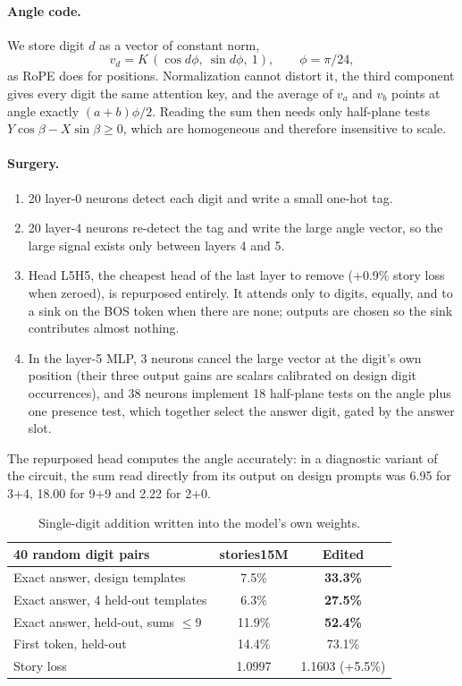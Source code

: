 \documentclass[11pt]{article}
\begin{document}
\paragraph{Angle code.} We store digit $d$ as a vector of constant norm,
\begin{equation}
v_d = K\,(\cos d\phi,\ \sin d\phi,\ 1), \qquad \phi=\pi/24,
\end{equation}
as RoPE does for positions. Normalization cannot distort it, the third component gives every digit the same attention key, and the average of $v_a$ and $v_b$ points at angle exactly $(a+b)\phi/2$. Reading the sum then needs only half-plane tests $Y\cos\beta - X\sin\beta \ge 0$, which are homogeneous and therefore insensitive to scale.

\paragraph{Surgery.}
\begin{enumerate}[leftmargin=*]
\item 20 layer-0 neurons detect each digit and write a small one-hot tag.
\item 20 layer-4 neurons re-detect the tag and write the large angle vector, so the large signal exists only between layers 4 and 5.
\item Head L5H5, the cheapest head of the last layer to remove (+0.9\% story loss when zeroed), is repurposed entirely. It attends only to digits, equally, and to a sink on the BOS token when there are none; outputs are chosen so the sink contributes almost nothing.
\item In the layer-5 MLP, 3 neurons cancel the large vector at the digit's own position (their three output gains are scalars calibrated on design digit occurrences), and 38 neurons implement 18 half-plane tests on the angle plus one presence test, which together select the answer digit, gated by the answer slot.
\end{enumerate}

The repurposed head computes the angle accurately: in a diagnostic variant of the circuit, the sum read directly from its output on design prompts was 6.95 for 3+4, 18.00 for 9+9 and 2.22 for 2+0.

\begin{table}[h]
\centering
\begin{tabular}{lcc}
\toprule
40 random digit pairs & stories15M & Edited \\
\midrule
Exact answer, design templates & 7.5\% & \textbf{33.3\%} \\
Exact answer, 4 held-out templates & 6.3\% & \textbf{27.5\%} \\
Exact answer, held-out, sums $\le 9$ & 11.9\% & \textbf{52.4\%} \\
First token, held-out & 14.4\% & 73.1\% \\
Story loss & 1.0997 & 1.1603 (+5.5\%) \\
\bottomrule
\end{tabular}
\caption{Single-digit addition written into the model's own weights.}
\end{table}
\end{document}
